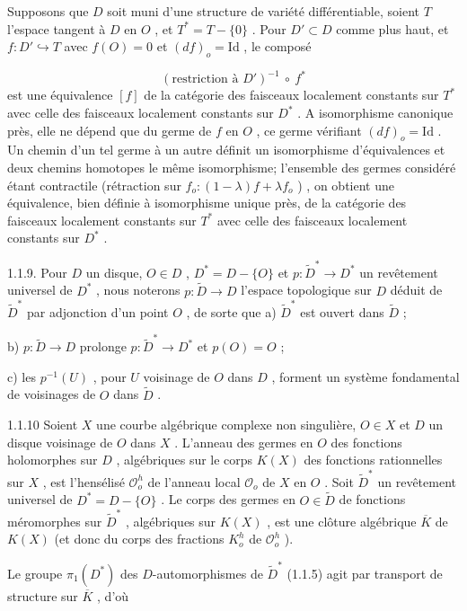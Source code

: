 Supposons que $D$ soit muni d'une structure de variété différentiable, soient $T$ l'espace tangent à $D$ en $O$ , et $T^{*} = T-\{0\}$ . Pour $D' \subset D$ comme plus haut, et $f : D' \hookrightarrow T$ avec $f(O) = 0$ et $(df)_{o} = \mathrm{Id}$ , le composé

\begin{equation*}
(\text{restriction à } D')^{-1} \ \circ \ f^{*}
\end{equation*}
est une équivalence $[f]$ de la catégorie des faisceaux localement constants sur $T^{*}$ avec celle des faisceaux localement constants sur $D^{*}$ . A isomorphisme canonique près, elle ne dépend que du germe de $f$ en $O$ , ce germe vérifiant $(df)_{o} = \mathrm{Id}$ . Un chemin d'un tel germe à un autre définit un isomorphisme d'équivalences et deux chemins homotopes le même isomorphisme; l'ensemble des germes considéré étant contractile (rétraction sur $f_{o} : (1-\lambda)f + \lambda f_{o}$ ) , on obtient une équivalence, bien définie à isomorphisme unique près, de la catégorie des faisceaux localement constants sur $T^{*}$ avec celle des faisceaux localement constants sur $D^{*}$ .

1.1.9. Pour $D$ un disque, $O \in D$ , $D^{*} = D-\{O\}$ et $p : \tilde{D}^{*} \to D^{*}$ un revêtement universel de $D^{*}$ , nous noterons $p : \tilde{D} \to D$ l'espace topologique sur $D$ déduit de $\tilde{D}^{*}$ par adjonction d'un point $O$ , de sorte que
a) $\widetilde{D}^*$ est ouvert dans $\widetilde{D}$ ;

b) $p : \widetilde{D} \to D$ prolonge $p : \widetilde{D}^* \to D^*$ et $p(O) = O$ ;

c) les $p^{-1}(U)$ , pour $U$ voisinage de $O$ dans $D$ , forment un système fondamental de voisinages de $O$ dans $\widetilde{D}$ .

1.1.10 Soient $X$ une courbe algébrique complexe non singulière, $O \in X$ et $D$ un disque voisinage de $O$ dans $X$ . L'anneau des germes en $O$ des fonctions holomorphes sur $D$ , algébriques sur le corps $K(X)$ des fonctions rationnelles sur $X$ , est l'hensélisé $\mathcal{O}_o^h$ de l'anneau local $\mathcal{O}_o$ de $X$ en $O$ . Soit $\widetilde{D}^*$ un revêtement universel de $D^* = D-\{O\}$ . Le corps des germes en $O \in \widetilde{D}$ de fonctions méromorphes sur $\widetilde{D}^*$ , algébriques sur $K(X)$ , est une clôture algébrique $\overline{K}$ de $K(X)$ (et donc du corps des fractions $K_o^h$ de $\mathcal{O}_o^h$ ).

Le groupe $\pi_1(D^*)$ des $D$-automorphismes de $\widetilde{D}^*$ (1.1.5) agit par transport de structure sur $\overline{K}$ , d'où

